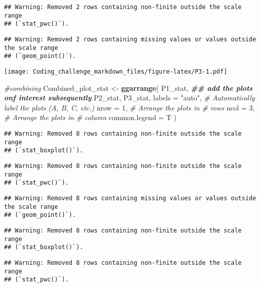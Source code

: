 \documentclass[
]{article}
\newenvironment{Shaded}{\begin{snugshade}}{\end{snugshade}}
\newcommand{\AttributeTok}[1]{\textcolor[rgb]{0.13,0.29,0.53}{#1}}
\newcommand{\CommentTok}[1]{\textcolor[rgb]{0.56,0.35,0.01}{\textit{#1}}}
\newcommand{\DecValTok}[1]{\textcolor[rgb]{0.00,0.00,0.81}{#1}}
\newcommand{\DocumentationTok}[1]{\textcolor[rgb]{0.56,0.35,0.01}{\textbf{\textit{#1}}}}
\newcommand{\FunctionTok}[1]{\textcolor[rgb]{0.13,0.29,0.53}{\textbf{#1}}}
\newcommand{\NormalTok}[1]{#1}
\newcommand{\OtherTok}[1]{\textcolor[rgb]{0.56,0.35,0.01}{#1}}
\newcommand{\StringTok}[1]{\textcolor[rgb]{0.31,0.60,0.02}{#1}}
\begin{document}
\begin{verbatim}
## Warning: Removed 2 rows containing non-finite outside the scale range
## (`stat_pwc()`).
\end{verbatim}

\begin{verbatim}
## Warning: Removed 2 rows containing missing values or values outside the scale range
## (`geom_point()`).
\end{verbatim}

\texttt{[image: Coding\_challenge\_markdown\_files/figure-latex/P3-1.pdf]}

\begin{Shaded}
\begin{Highlighting}[]
\CommentTok{\#combining}
\NormalTok{Combined\_plot\_stat }\OtherTok{\textless{}{-}} \FunctionTok{ggarrange}\NormalTok{(}
\NormalTok{  P1\_stat,   }\DocumentationTok{\#\# add the plots onf interest subsequently}
\NormalTok{  P2\_stat,}
\NormalTok{  P3\_stat,}
  \AttributeTok{labels =} \StringTok{"auto"}\NormalTok{,  }\CommentTok{\# Automatically label the plots (A, B, C, etc.)}
  \AttributeTok{nrow =} \DecValTok{1}\NormalTok{,  }\CommentTok{\# Arrange the plots in \# rows}
  \AttributeTok{ncol =} \DecValTok{3}\NormalTok{,  }\CommentTok{\# Arrange the plots in \# column}
  \AttributeTok{common.legend =}\NormalTok{ T}
\NormalTok{)}
\end{Highlighting}
\end{Shaded}

\begin{verbatim}
## Warning: Removed 8 rows containing non-finite outside the scale range
## (`stat_boxplot()`).
\end{verbatim}

\begin{verbatim}
## Warning: Removed 8 rows containing non-finite outside the scale range
## (`stat_pwc()`).
\end{verbatim}

\begin{verbatim}
## Warning: Removed 8 rows containing missing values or values outside the scale range
## (`geom_point()`).
\end{verbatim}

\begin{verbatim}
## Warning: Removed 8 rows containing non-finite outside the scale range
## (`stat_boxplot()`).
\end{verbatim}

\begin{verbatim}
## Warning: Removed 8 rows containing non-finite outside the scale range
## (`stat_pwc()`).
\end{verbatim}
\end{document}
